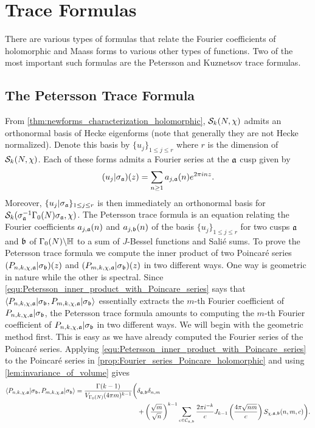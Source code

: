 \chapter{Trace Formulas}
  There are various types of formulas that relate the Fourier coefficients of holomorphic and Maass forms to various other types of functions. Two of the most important such formulas are the Petersson and Kuznetsov trace formulas.
  \section{The Petersson Trace Formula}
    From \cref{thm:newforms_characterization_holomorphic}, $\mathcal{S}_{k}(N,\chi)$ admits an orthonormal basis of Hecke eigenforms (note that generally they are not Hecke normalized). Denote this basis by $\{u_{j}\}_{1 \le j \le r}$ where $r$ is the dimension of $\mathcal{S}_{k}(N,\chi)$. Each of these forms admits a Fourier series at the $\mathfrak{a}$ cusp given by
    \[
      (u_{j}|\sigma_{\mathfrak{a}})(z) = \sum_{n \ge 1}a_{j,\mathfrak{a}}(n)e^{2\pi inz}.
    \]
    Moreover, $\{u_{j}|\sigma_{\mathfrak{a}}\}_{1 \le j \le r}$ is then immediately an orthonormal basis for $\mathcal{S}_{k}(\sigma_{\mathfrak{a}}^{-1}\Gamma_{0}(N)\sigma_{\mathfrak{a}},\chi)$.
    The Petersson trace formula is an equation relating the Fourier coefficients $a_{j,\mathfrak{a}}(n)$ and $a_{j,\mathfrak{b}}(n)$ of the basis $\{u_{j}\}_{1 \le j \le r}$ for two cusps $\mathfrak{a}$ and $\mathfrak{b}$ of $\Gamma_{0}(N)\backslash\mathbb{H}$ to a sum of $J$-Bessel functions and Sali\'e sums. To prove the Petersson trace formula we compute the inner product of two Poincar\'e series $(P_{n,k,\chi,\mathfrak{a}}|\sigma_{\mathfrak{b}})(z)$ and $(P_{m,k,\chi,\mathfrak{a}}|\sigma_{\mathfrak{b}})(z)$ in two different ways. One way is geometric in nature while the other is spectral. Since \cref{equ:Petersson_inner_product_with_Poincare_series} says that $\langle P_{n,k,\chi,\mathfrak{a}}|\sigma_{\mathfrak{b}},P_{m,k,\chi,\mathfrak{a}}|\sigma_{\mathfrak{b}}\rangle$ essentially extracts the $m$-th Fourier coefficient of $P_{n,k,\chi,\mathfrak{a}}|\sigma_{\mathfrak{b}}$, the Petersson trace formula amounts to computing the $m$-th Fourier coefficient of $P_{n,k,\chi,\mathfrak{a}}|\sigma_{\mathfrak{b}}$ in two different ways. We will begin with the geometric method first. This is easy as we have already computed the Fourier series of the Poincar\'e series. Applying \cref{equ:Petersson_inner_product_with_Poincare_series} to the Poincar\'e series in \cref{prop:Fourier_series_Poincare_holomorphic} and using \cref{lem:invariance_of_volume} gives
    \begin{align*}
      \langle P_{n,k,\chi,\mathfrak{a}}|\sigma_{\mathfrak{b}},P_{m,k,\chi,\mathfrak{a}}|\sigma_{\mathfrak{b}}\rangle = \frac{\Gamma(k-1)}{V_{\Gamma_{0}(N)}(4\pi m)^{k-1}}\bigg(&\delta_{\mathfrak{a},\mathfrak{b}}\delta_{n,m} \\
      &+\left(\frac{\sqrt{m}}{\sqrt{n}}\right)^{k-1}\sum_{c \in \mathcal{C}_{\mathfrak{a},\mathfrak{b}}}\frac{2\pi i^{-k}}{c}J_{k-1}\left(\frac{4\pi\sqrt{nm}}{c}\right)S_{\chi,\mathfrak{a},\mathfrak{b}}(n,m,c)\bigg).
    \end{align*}
